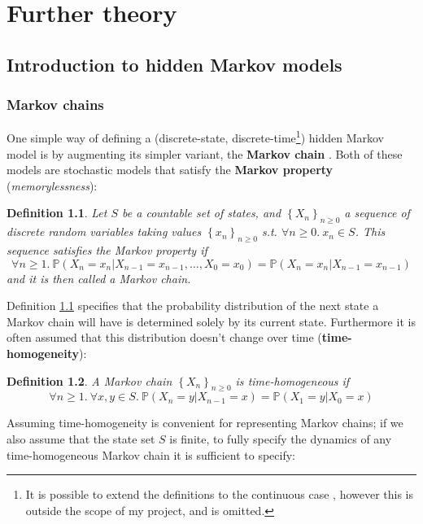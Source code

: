 \documentclass[12pt,a4paper,twoside,openright]{report}
\newtheorem{mydef}{Definition}
\newcommand\Prob{\mathbb{P}}
\begin{document}
\appendix

\chapter{Further theory}

\section{Introduction to hidden Markov models}\label{secintrohmm}

\subsection{Markov chains}

One simple way of defining a (discrete-state, discrete-time\footnote{It is possible to extend the definitions to the continuous case \cite{norris1998markov}, however this is outside the scope of my project, and is omitted.}) hidden Markov model is by augmenting its simpler variant, the \textbf{Markov chain} \cite{markov1906rasprostranenie}. Both of these models are stochastic models that satisfy the \textbf{Markov property} (\emph{memorylessness}):
\begin{mydef}\label{def:4}
\rm Let $S$ be a countable set of \emph{states}, and $\left\{X_n\right\}_{n \geq 0}$ a sequence of discrete random variables taking values $\left\{x_n\right\}_{n \geq 0}$ s.t. $\forall n\geq 0.\ x_n \in S$. This sequence satisfies the \emph{Markov property} if
\[\forall n\geq 1.\ \Prob(X_n = x_n | X_{n-1} = x_{n-1}, \dots, X_0 = x_0) = \Prob(X_n = x_n | X_{n-1} = x_{n-1})\]
and it is then called a \emph{Markov chain}.
\end{mydef}
\noindent Definition \ref{def:4} specifies that the probability distribution of the next state a Markov chain will have is determined solely by its current state. Furthermore it is often assumed that this distribution doesn't change over time (\textbf{time-homogeneity}):
\begin{mydef}
\rm A Markov chain $\left\{X_n\right\}_{n \geq 0}$ is \emph{time-homogeneous} if
\[\forall n\geq 1.\ \forall x, y \in S.\ \Prob(X_n = y | X_{n-1} = x) = \Prob(X_1 = y | X_0 = x)\]
\end{mydef}
\noindent Assuming time-homogeneity is convenient for representing Markov chains; if we also assume that the state set $S$ is finite, to fully specify the dynamics of any time-homogeneous Markov chain it is sufficient to specify:
\end{document}

